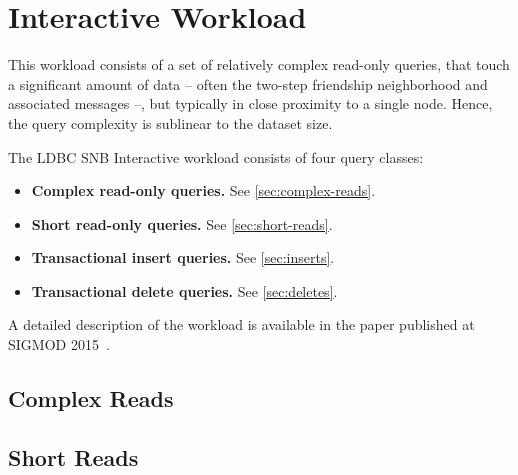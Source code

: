 \chapter{Interactive Workload}
\label{section:interactive}

This workload consists of a set of relatively complex read-only queries, that touch a significant
amount of data -- often the two-step friendship neighborhood and associated messages --, but typically in close proximity to a single node. Hence, the query complexity is sublinear to the dataset size.

The LDBC SNB Interactive workload consists of four query classes:

\begin{itemize}
\item \textbf{Complex read-only queries.} See \autoref{sec:complex-reads}.
\item \textbf{Short read-only queries.} See \autoref{sec:short-reads}.
\item \textbf{Transactional insert queries.} See \autoref{sec:inserts}.
\item \textbf{Transactional delete queries.} See \autoref{sec:deletes}.
\end{itemize}

A detailed description of the workload is available in the paper published at \mbox{SIGMOD} 2015~\cite{DBLP:conf/sigmod/ErlingALCGPPB15}.


\section{Complex Reads}
\label{sec:complex-reads}




\section{Short Reads}
\label{sec:short-reads}

